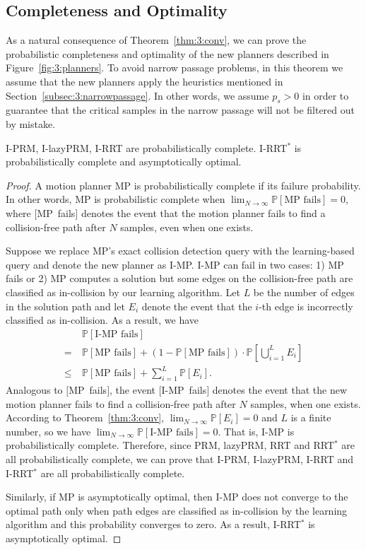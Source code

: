 \subsection{Completeness and Optimality}
As a natural consequence of Theorem~\ref{thm:3:conv}, we can prove the probabilistic completeness and optimality of the new planners described in Figure~\ref{fig:3:planners}. To avoid narrow passage problems, in this theorem we assume that the new planners apply the heuristics mentioned in Section~\ref{subsec:3:narrowpassage}. In other words, we assume $p_s > 0$ in order to guarantee that the critical samples in the narrow passage will not be filtered out by mistake. 
\begin{theorem}
  \label{thm:3:complete}
  I-PRM, I-lazyPRM, I-RRT are probabilistically complete. I-RRT${}^*$ is probabilistically complete and asymptotically optimal.
\end{theorem}
\begin{proof}
  A motion planner MP is probabilistically complete if its failure probability. In other words, MP is probabilistic complete when $\lim_{N\rightarrow \infty}\mathbb P [\text{MP fails}] = 0$, where \mbox{$[$MP fails$]$} denotes the event that the motion planner fails to find a collision-free path after $N$ samples, even when one exists. 

  Suppose we replace MP's exact collision detection query with the learning-based query and denote the new planner as I-MP. I-MP can fail in two cases: 1) MP fails or 2) MP computes a solution but some edges on the collision-free path are classified as in-collision by our learning algorithm. Let $L$ be the number of edges in the solution path and let $E_i$ denote the event that the $i$-th edge is incorrectly classified as in-collision. As a result, we have
  \begin{equation}
    \begin{aligned}
      & \ \mathbb P [\text{I-MP fails}] \\
      =& \ \mathbb P [\text{MP fails}] + (1 - \mathbb P [\text{MP fails}]) \cdot \mathbb P[\bigcup_{i=1}^L E_i] \\
      \leq& \ \mathbb P [\text{MP fails}] + \sum_{i=1}^L \mathbb P[E_i].
    \end{aligned}
  \end{equation}
  Analogous to \mbox{$[$MP fails$]$}, the event \mbox{$[$I-MP fails$]$} denotes the event that the new motion planner fails to find a collision-free path after $N$ samples, when one exists.
  According to Theorem~\ref{thm:3:conv}, $\lim_{N\rightarrow \infty}\mathbb P [E_i] = 0$ and $L$ is a finite number, so we have $\lim_{N\rightarrow \infty}\mathbb P [\text{I-MP fails}] = 0$. That is, I-MP is probabilistically complete. Therefore, since PRM, lazyPRM, RRT and RRT${}^*$ are all probabilistically complete, we can prove that I-PRM, I-lazyPRM, I-RRT and  I-RRT${}^*$ are all probabilistically complete.

  Similarly, if MP is asymptotically optimal, then I-MP does not converge to the optimal path only when path edges are classified as in-collision by the learning algorithm and this probability converges to zero. As a result, I-RRT${}^*$ is asymptotically optimal.
\end{proof}
